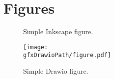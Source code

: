 \documentclass[src/tex/main.tex]{subfiles}
\begin{document}
\section{Figures}

\begin{figure}[h]
  \begin{center}
  \end{center}
  \caption{Simple Inkscape figure.}
\end{figure}

\begin{figure}[h]
  \center
  \texttt{[image: \\gfxDrawioPath/figure.pdf]}
  \caption{Simple Drawio figure.}
\end{figure}
\end{document}
